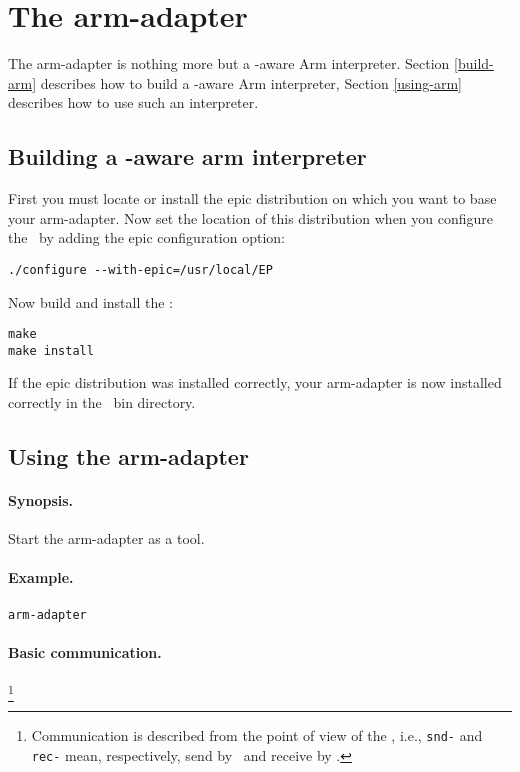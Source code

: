 
\section{\label{arm-adapter}The arm-adapter}

The arm-adapter is nothing more but a \TB -aware Arm interpreter.
Section \ref{build-arm} describes how to build a \TB -aware Arm interpreter,
Section \ref{using-arm} describes how to use such an interpreter.

\subsection{\label{build-arm}Building a \TB -aware arm interpreter}

First you must locate or install the epic distribution on which you
want to base your arm-adapter. Now set the location of this distribution
when you configure the \TB\ by adding the epic configuration option:
\begin{verbatim}
./configure --with-epic=/usr/local/EP
\end{verbatim}

Now build and install the \TB:
\begin{verbatim}
make
make install
\end{verbatim}
If the epic distribution was installed correctly, your arm-adapter is
now installed correctly in the \TB\ bin directory.

\subsection{\label{using-arm}Using the arm-adapter}

\paragraph{Synopsis.} Start the arm-adapter as a tool.

\paragraph{Example.} {\tt arm-adapter}

\paragraph{Basic communication.} 
\hspace{-0.3cm}\footnote{Communication is described
from the point of view of the \TB, i.e., {\tt snd-} and {\tt rec-}
mean, respectively, send by \TB\ and receive by \TB.}

